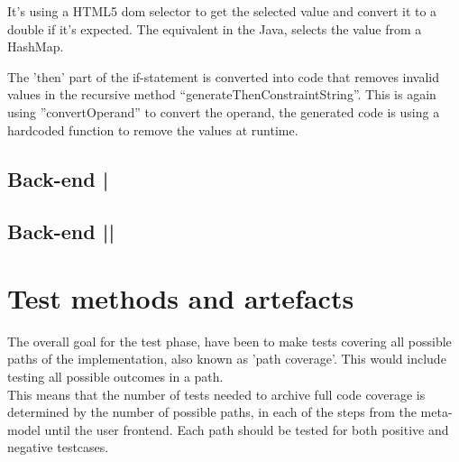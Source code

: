 \documentclass[paper=a4, fontsize=11pt]{scrartcl} %
\numberwithin{equation}{section} %
\numberwithin{figure}{section} %
\numberwithin{table}{section} %
\begin{document}
It’s using a HTML5 dom selector to get the selected value and convert it to a double if it’s expected.
The equivalent in the Java, selects the value from a HashMap.



The 'then' part of the if-statement is converted into code that removes invalid values in the recursive method “generateThenConstraintString”. This is again using ”convertOperand” to convert the operand, the generated code is using a hardcoded function to remove the values at runtime.


\subsection{Back-end |}
\subsection{Back-end ||}

\section{Test methods and artefacts}
The overall goal for the test phase, have been to make tests covering all possible paths of the implementation, also known as 'path coverage'. This would include testing all possible outcomes in a path.\\ 
This means that the number of tests needed to archive full code coverage is determined by the number of possible paths, in each of the steps from the meta-model until the user frontend. Each path should be tested for both positive and negative testcases.\\
\end{document}
